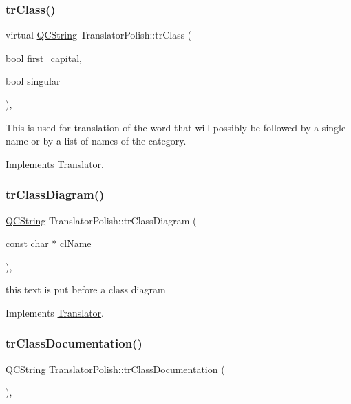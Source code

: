 \subsubsection{\texorpdfstring{trClass()}{trClass()}}
{\footnotesize\ttfamily virtual \mbox{\hyperlink{class_q_c_string}{Q\+C\+String}} Translator\+Polish\+::tr\+Class (\begin{DoxyParamCaption}\item[{bool}]{first\+\_\+capital,  }\item[{bool}]{singular }\end{DoxyParamCaption})\hspace{0.3cm}{\ttfamily [inline]}, {\ttfamily [virtual]}}

This is used for translation of the word that will possibly be followed by a single name or by a list of names of the category. 

Implements \mbox{\hyperlink{class_translator}{Translator}}.

\mbox{\label{class_translator_polish_a9c1f72c3c22421dc45c3cb5986eeaa29}} 
\subsubsection{\texorpdfstring{trClassDiagram()}{trClassDiagram()}}
{\footnotesize\ttfamily \mbox{\hyperlink{class_q_c_string}{Q\+C\+String}} Translator\+Polish\+::tr\+Class\+Diagram (\begin{DoxyParamCaption}\item[{const char $\ast$}]{cl\+Name }\end{DoxyParamCaption})\hspace{0.3cm}{\ttfamily [inline]}, {\ttfamily [virtual]}}

this text is put before a class diagram 

Implements \mbox{\hyperlink{class_translator}{Translator}}.

\mbox{\label{class_translator_polish_ad0c01539dc5aec5091c0258ea6a869b4}} 
\subsubsection{\texorpdfstring{trClassDocumentation()}{trClassDocumentation()}}
{\footnotesize\ttfamily \mbox{\hyperlink{class_q_c_string}{Q\+C\+String}} Translator\+Polish\+::tr\+Class\+Documentation (\begin{DoxyParamCaption}{ }\end{DoxyParamCaption})\hspace{0.3cm}{\ttfamily [inline]}, {\ttfamily [virtual]}}


